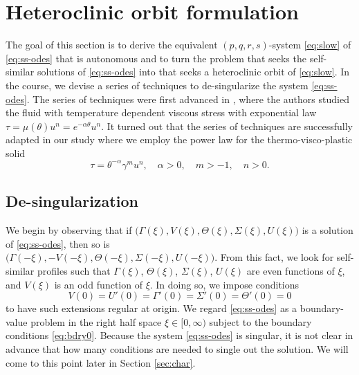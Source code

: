 \documentclass[a4paper,11pt]{article}
\theoremstyle{remark}
\begin{document}
\section{Heteroclinic orbit formulation} \label{sec:formulation}
The goal of this section is to derive the equivalent $(p,q,r,s)$-system \eqref{eq:slow} of \eqref{eq:ss-odes} that is autonomous and to turn the problem that seeks the self-similar solutions of \eqref{eq:ss-odes} into that seeks a heteroclinic orbit of \eqref{eq:slow}. In the course, we devise a series of techniques to de-singularize the system \eqref{eq:ss-odes}. The series of techniques were first advanced in \cite{KOT14}, where the authors studied the fluid with temperature dependent viscous stress with exponential law $ \tau = \mu(\theta)u^n = e^{-\alpha\theta} u^n.$
It turned out that the series of techniques are successfully adapted in our study where we employ the power law for the thermo-visco-plastic solid %
$$ \tau = \theta^{-\alpha}\gamma^{m}u^n, \quad \alpha>0, \quad m>-1, \quad n>0.$$

\subsection{De-singularization}
We begin by observing that if $\big(\Gamma(\xi), V(\xi), \Theta(\xi), \Sigma(\xi), U(\xi)\big)$ is a solution of \eqref{eq:ss-odes}, then so is \\$\big(\Gamma(-\xi), -V(-\xi), \Theta(-\xi), \Sigma(-\xi), U(-\xi)\big)$. From this fact, we look for self-similar profiles such that $\Gamma(\xi)$, $\Theta(\xi)$, $\Sigma(\xi)$, $U(\xi)$ are even functions of $\xi$, and $V(\xi)$ is an odd function of $\xi$. In doing so, we impose conditions
\begin{equation}
 V(0)=U'(0)=\Gamma'(0)=\Sigma'(0)=\Theta'(0)=0 \label{eq:bdry0}
\end{equation}
to have such extensions regular at origin. We regard \eqref{eq:ss-odes} as a boundary-value problem in the right half space $\xi \in [0,\infty)$ subject to the boundary conditions \eqref{eq:bdry0}. Because the system \eqref{eq:ss-odes} is singular, it is not clear in advance that how many conditions are needed to single out the solution. We will come to this point later in Section \ref{sec:char}.%
\end{document}
